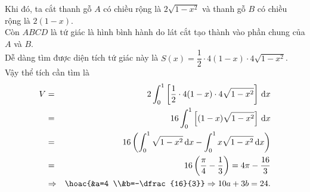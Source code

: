 \begin{bt}
{\begin{center}
		\end{center}
		Khi đó, ta cắt thanh gỗ $A$ có chiều rộng  là $2\sqrt{1-x^2}$ và thanh gỗ $B$ có chiều rộng là $2(1-x)$.\\
		Còn $ABCD$ là tứ giác là hình bình hành do lát cắt tạo thành vào  phần chung của $A$ và $B$.\\
		Dễ dàng tìm được diện tích tứ giác này  là $S(x)=\dfrac{1}{2}\cdot 4(1-x)\cdot 4\sqrt{1-x^2}$.\\
		Vậy thể  tích cần tìm là
		\begin{eqnarray*}
			V&=&2 \displaystyle\int_0^1\left[\dfrac{1}{2}  \cdot 4(1-x) \cdot 4 \sqrt{1-x^2}\right] \mathrm{\,d}x\\
			&=&16 \displaystyle\int_0^1\left[(1-x) \sqrt{1-x^2}\right] \mathrm{\,d}x \\ 
			&=&16\left(\displaystyle\int_0^1 \sqrt{1-x^2} \mathrm{\,d}x -\displaystyle\int_0^1 x \sqrt{1-x^2}  \mathrm{\,d} x\right)\\
			&=&16\left(\dfrac{\pi}{4}-\dfrac{1}{3}\right)=4 \pi-\dfrac{16}{3}\\ &\Rightarrow& \hoac{&a=4 \\&b=-\dfrac{16}{3}} \Rightarrow 10a+3b=24. 
		\end{eqnarray*}
	 }
\end{bt}

